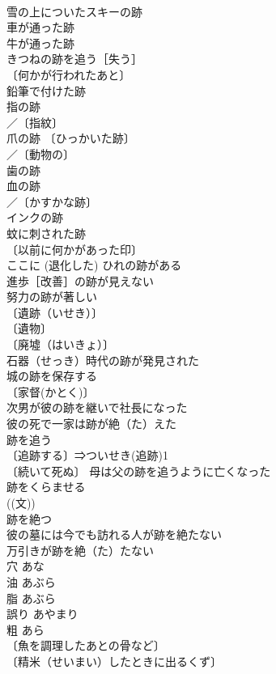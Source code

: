 \documentclass[8pt]{extreport}
\begin{document}
\begin{CJK}{UTF8}{min}
\\	雪の上についたスキーの跡 
\\	車が通った跡 
\\	牛が通った跡 
\\	きつねの跡を追う［失う］ 
\\	〔何かが行われたあと〕
\\	鉛筆で付けた跡 
\\	指の跡 
\\	／〔指紋〕
\\	爪の跡 〔ひっかいた跡〕
\\	／〔動物の〕
\\	歯の跡 
\\	血の跡 
\\	／〔かすかな跡〕
\\	インクの跡 
\\	蚊に刺された跡 
\\	〔以前に何かがあった印〕
\\	ここに (退化した) ひれの跡がある 
\\	進歩［改善］の跡が見えない 
\\	努力の跡が著しい 
\\	〔遺跡（いせき）〕
\\	〔遺物〕
\\	〔廃墟（はいきょ）〕
\\	石器（せっき）時代の跡が発見された 
\\	城の跡を保存する 
\\	〔家督(かとく)〕　
\\	次男が彼の跡を継いで社長になった 
\\	彼の死で一家は跡が絶（た）えた 
\\	跡を追う 
\\	〔追跡する〕⇒ついせき(追跡)1 
\\	〔続いて死ぬ〕 母は父の跡を追うように亡くなった 
\\	跡をくらませる 
\\	((文)) 
\\	跡を絶つ 
\\	彼の墓には今でも訪れる人が跡を絶たない 
\\	万引きが跡を絶（た）たない 
\\	穴	あな	
\\	油	あぶら	
\\	脂	あぶら	
\\	誤り	あやまり	
\\	粗	あら	
\\	〔魚を調理したあとの骨など〕
\\	〔精米（せいまい）したときに出るくず〕

\end{CJK}
\end{document}

